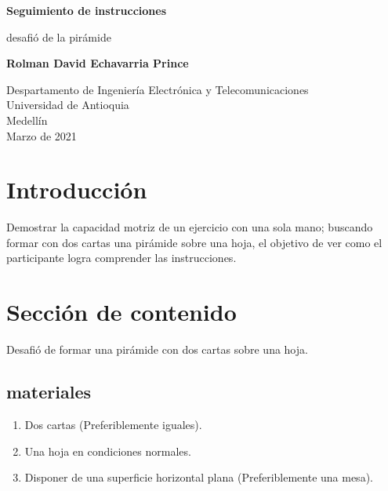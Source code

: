 \documentclass{article}
\begin{document}
\begin{titlepage}
    \begin{center}
        \vspace*{1cm}
            
        \Huge
        \textbf{Seguimiento de instrucciones}
            
        \vspace{0.5cm}
        \LARGE
        desafió de la pirámide 
            
        \vspace{1.5cm}
            
        \textbf{Rolman David Echavarria Prince}
            
        \vfill
            
        \vspace{0.8cm}
            
        \Large
        Despartamento de Ingeniería Electrónica y Telecomunicaciones\\
        Universidad de Antioquia\\
        Medellín\\
        Marzo de 2021
            
    \end{center}
\end{titlepage}

\tableofcontents
\newpage
\section{Introducción}\label{intro}
Demostrar la capacidad motriz de un ejercicio con una sola mano; buscando formar con dos cartas una pirámide sobre una hoja, el objetivo de ver como el participante logra comprender las instrucciones.

\section{Sección de contenido} \label{contenido}
Desafió de formar una pirámide con dos cartas sobre una hoja.
\subsection{materiales}
\begin{enumerate}
    \item Dos cartas (Preferiblemente iguales).
    \item Una hoja en condiciones normales.
    \item Disponer de una superficie horizontal plana (Preferiblemente una mesa).
\end{enumerate}
\end{document}

